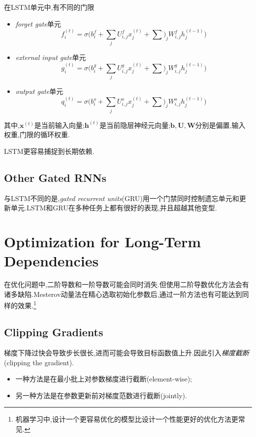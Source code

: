 在LSTM单元中,有不同的门限
\begin{itemize}
    \item \textit{forget gate}单元
    \begin{equation}
    f_i^{(t)}=\sigma\Big(b_i^f+\sum_jU_{i,j}^fx_j^{(t)}+\sum)_jW_{i,j}^fh_j^{(t-1)}\Big)
    \end{equation}
    \item \textit{external input gate}单元
    \begin{equation}
    g_i^{(t)}=\sigma\Big(b_i^g+\sum_jU_{i,j}^gx_j^{(t)}+\sum)_jW_{i,j}^gh_j^{(t-1)}\Big)
    \end{equation}
    \item \textit{output gate}单元
    \begin{equation}
    q_i^{(t)}=\sigma\Big(b_i^o+\sum_jU_{i,j}^ox_j^{(t)}+\sum)_jW_{i,j}^oh_j^{(t-1)}\Big)
    \end{equation}
\end{itemize}
其中,$\mathbf x^{(t)}$是当前输入向量;$\mathbf h^{(t)}$是当前隐层神经元向量;$\mathbf{b,U,W}$分别是偏置,输入权重,门限的循环权重.

LSTM更容易捕捉到长期依赖.

\subsection{Other Gated RNNs}

与LSTM不同的是,\textit{gated recurrent units}(GRU)用一个门禁同时控制遗忘单元和更新单元.LSTM和GRU在多种任务上都有很好的表现,并且超越其他变型.

\section{Optimization for Long-Term Dependencies}

在优化问题中,二阶导数和一阶导数可能会同时消失.但使用二阶导数优化方法会有诸多缺陷.Mesterov动量法在精心选取初始化参数后,通过一阶方法也有可能达到同样的效果.\footnote{机器学习中,设计一个更容易优化的模型比设计一个性能更好的优化方法更常见.}

\subsection{Clipping Gradients}

梯度下降过快会导致步长很长,进而可能会导致目标函数值上升.因此引入\textit{梯度截断}(clipping the gradient).
\begin{itemize}
    \item 一种方法是在最小批上对参数梯度进行截断(element-wise);
    \item 另一种方法是在参数更新前对梯度范数进行截断(jointly).
\end{itemize}


